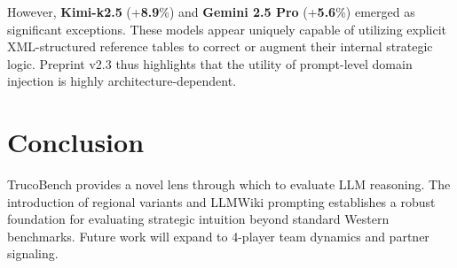 \documentclass[11pt]{article}
\begin{document}
However, \textbf{Kimi-k2.5} (+\textbf{8.9}\%) and \textbf{Gemini 2.5 Pro} (+\textbf{5.6}\%) emerged as significant exceptions. These models appear uniquely capable of utilizing explicit XML-structured reference tables to correct or augment their internal strategic logic. Preprint v2.3 thus highlights that the utility of prompt-level domain injection is highly architecture-dependent.

\section{Conclusion}
TrucoBench provides a novel lens through which to evaluate LLM reasoning. The introduction of regional variants and LLMWiki prompting establishes a robust foundation for evaluating strategic intuition beyond standard Western benchmarks. Future work will expand to 4-player team dynamics and partner signaling.
\end{document}
